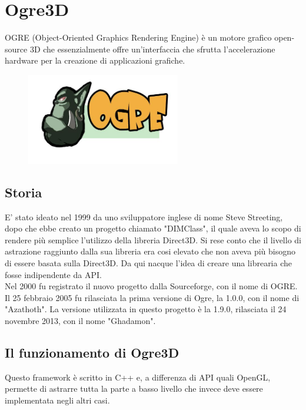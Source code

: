 
\section{Ogre3D}
OGRE (Object-Oriented Graphics Rendering Engine) è un motore grafico open-source 3D che essenzialmente offre un'interfaccia che sfrutta l'accelerazione hardware per la creazione di applicazioni grafiche. \\

\begin{figure}
\centering
\includegraphics[width=0.6\textwidth]{images/ogre/ogrelogo-small.jpg}

\end{figure}

\subsection{Storia}
E' stato ideato nel 1999 da uno sviluppatore inglese di nome Steve Streeting, dopo che ebbe creato un progetto chiamato "DIMClass", il quale aveva lo scopo di rendere più semplice l'utilizzo della libreria Direct3D. Si rese conto che il livello di astrazione raggiunto dalla sua libreria era cosi elevato che non aveva più bisogno di essere basata sulla Direct3D. Da qui nacque l'idea di creare una librearia che fosse indipendente da API.\\
Nel 2000 fu registrato il nuovo progetto dalla Sourceforge, con il nome di OGRE. Il 25 febbraio 2005 fu rilasciata la  prima versione di Ogre, la 1.0.0, con il nome di "Azathoth". La versione utilizzata in questo progetto è la 1.9.0, rilasciata il 24 novembre 2013, con il nome "Ghadamon".\\

\subsection{Il funzionamento di Ogre3D}
Questo framework è scritto in C++ e, a differenza di API quali OpenGL, permette di astrarre tutta la parte a basso livello che invece deve essere implementata negli altri casi.

